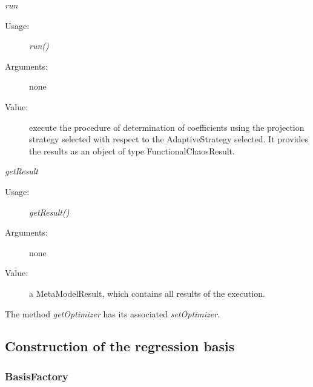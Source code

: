 \begin{description}
\begin{description}
\item \textit{run}
\begin{description}
\item[Usage:] \textit{run()}
\item[Arguments:] none
\item[Value:] execute the procedure of determination of coefficients using the projection strategy selected with respect to the AdaptiveStrategy selected. It provides the results as an object of type FunctionalChaosResult.
\end{description}
\bigskip

\item \textit{getResult}
\begin{description}
\item[Usage:] \textit{getResult()}
\item[Arguments:] none
\item[Value:] a MetaModelResult, which contains all results of the execution.
\end{description}

\end{description}

\end{description}


The method \textit{getOptimizer} has its associated \textit{setOptimizer}.



\newpage
\subsection{Construction of the regression basis}

\subsubsection{BasisFactory}


